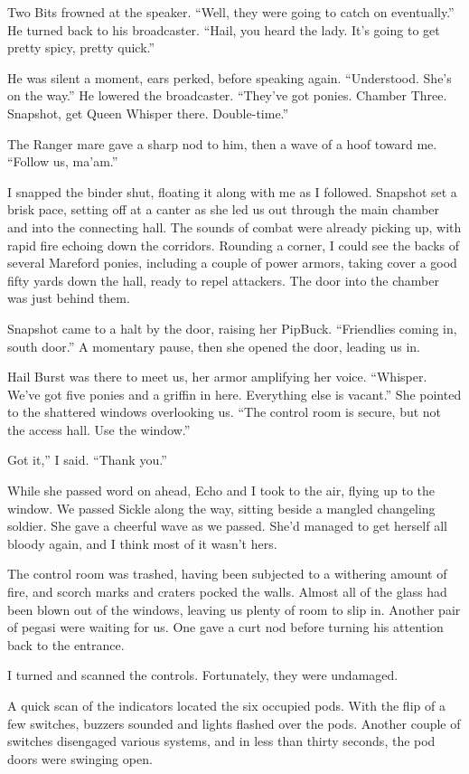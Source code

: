Two Bits frowned at the speaker. “Well, they were going to catch on eventually.” He turned back to his broadcaster. “Hail, you heard the lady. It’s going to get pretty spicy, pretty quick.”

He was silent a moment, ears perked, before speaking again. “Understood. She’s on the way.” He lowered the broadcaster. “They’ve got ponies. Chamber Three. Snapshot, get Queen Whisper there. Double-time.”

The Ranger mare gave a sharp nod to him, then a wave of a hoof toward me. “Follow us, ma’am.”

I snapped the binder shut, floating it along with me as I followed. Snapshot set a brisk pace, setting off at a canter as she led us out through the main chamber and into the connecting hall. The sounds of combat were already picking up, with rapid fire echoing down the corridors. Rounding a corner, I could see the backs of several Mareford ponies, including a couple of power armors, taking cover a good fifty yards down the hall, ready to repel attackers. The door into the chamber was just behind them.

Snapshot came to a halt by the door, raising her PipBuck. “Friendlies coming in, south door.” A momentary pause, then she opened the door, leading us in.

Hail Burst was there to meet us, her armor amplifying her voice. “Whisper. We’ve got five ponies and a griffin in here. Everything else is vacant.” She pointed to the shattered windows overlooking us. “The control room is secure, but not the access hall. Use the window.”

\leavevmode{}Got it,” I said. “Thank you.”

While she passed word on ahead, Echo and I took to the air, flying up to the window. We passed Sickle along the way, sitting beside a mangled changeling soldier. She gave a cheerful wave as we passed. She’d managed to get herself all bloody again, and I think most of it wasn’t hers.

The control room was trashed, having been subjected to a withering amount of fire, and scorch marks and craters pocked the walls. Almost all of the glass had been blown out of the windows, leaving us plenty of room to slip in. Another pair of pegasi were waiting for us. One gave a curt nod before turning his attention back to the entrance.

I turned and scanned the controls. Fortunately, they were undamaged.

A quick scan of the indicators located the six occupied pods. With the flip of a few switches, buzzers sounded and lights flashed over the pods. Another couple of switches disengaged various systems, and in less than thirty seconds, the pod doors were swinging open.

